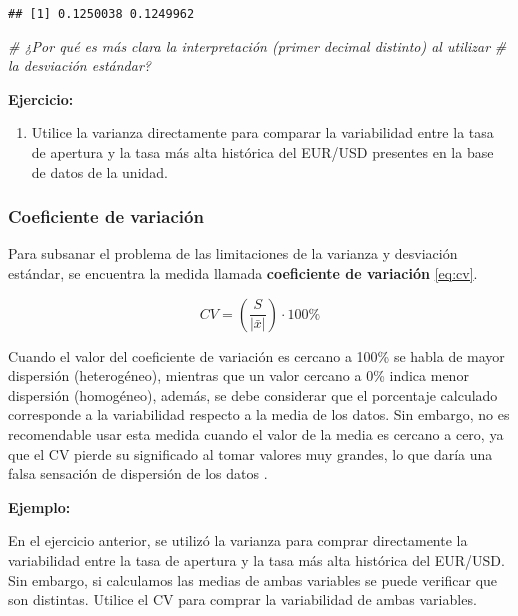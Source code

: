 \documentclass[
]{book}
\newenvironment{Shaded}{\begin{snugshade}}{\end{snugshade}}
\newcommand{\CommentTok}[1]{\textcolor[rgb]{0.56,0.35,0.01}{\textit{#1}}}
\providecommand{\tightlist}{%
  \setlength{\itemsep}{0pt}\setlength{\parskip}{0pt}}
\begin{document}
\begin{verbatim}
## [1] 0.1250038 0.1249962
\end{verbatim}

\begin{Shaded}
\begin{Highlighting}[]
\CommentTok{\# ¿Por qué es más clara la interpretación (primer decimal distinto) al utilizar}
\CommentTok{\# la desviación estándar?}
\end{Highlighting}
\end{Shaded}

\textbf{Ejercicio:}

\begin{enumerate}
\def\labelenumi{\arabic{enumi}.}
\tightlist
\item
  Utilice la varianza directamente para comparar la variabilidad entre la tasa de apertura y la tasa más alta histórica del EUR/USD presentes en la base de datos de la unidad.
\end{enumerate}

\hypertarget{coeficiente-de-variaciuxf3n}{%
\subsubsection*{Coeficiente de variación}\label{coeficiente-de-variaciuxf3n}}

Para subsanar el problema de las limitaciones de la varianza y desviación estándar, se encuentra la medida llamada \textbf{coeficiente de variación} \eqref{eq:cv}.

\begin{equation}
CV = \left(\frac{S}{|\bar{x}|}\right)\cdot 100\%
\label{eq:cv}
\end{equation}

Cuando el valor del coeficiente de variación es cercano a 100\% se habla de mayor dispersión (heterogéneo), mientras que un valor cercano a 0\% indica menor dispersión (homogéneo), además, se debe considerar que el porcentaje calculado corresponde a la variabilidad respecto a la media de los datos. Sin embargo, no es recomendable usar esta medida cuando el valor de la media es cercano a cero, ya que el CV pierde su significado al tomar valores muy grandes, lo que daría una falsa sensación de dispersión de los datos \citep[página 95]{anderson}.

\textbf{Ejemplo:}

En el ejercicio anterior, se utilizó la varianza para comprar directamente la variabilidad entre la tasa de apertura y la tasa más alta histórica del EUR/USD. Sin embargo, si calculamos las medias de ambas variables se puede verificar que son distintas. Utilice el CV para comprar la variabilidad de ambas variables.
\end{document}
